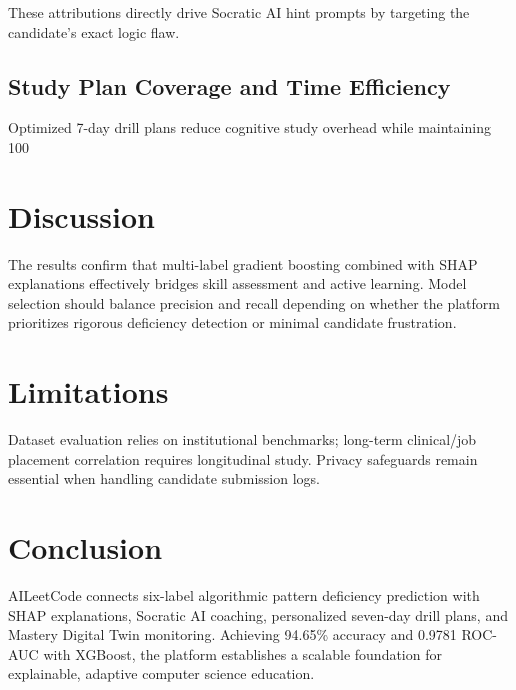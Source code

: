 \documentclass[conference]{IEEEtran}
\begin{document}
These attributions directly drive Socratic AI hint prompts by targeting the candidate's exact logic flaw.

\subsection{Study Plan Coverage and Time Efficiency}
Optimized 7-day drill plans reduce cognitive study overhead while maintaining 100%

\section{Discussion}
The results confirm that multi-label gradient boosting combined with SHAP explanations effectively bridges skill assessment and active learning. Model selection should balance precision and recall depending on whether the platform prioritizes rigorous deficiency detection or minimal candidate frustration.

\section{Limitations}
Dataset evaluation relies on institutional benchmarks; long-term clinical/job placement correlation requires longitudinal study. Privacy safeguards remain essential when handling candidate submission logs.

\section{Conclusion}
AILeetCode connects six-label algorithmic pattern deficiency prediction with SHAP explanations, Socratic AI coaching, personalized seven-day drill plans, and Mastery Digital Twin monitoring. Achieving 94.65\% accuracy and 0.9781 ROC-AUC with XGBoost, the platform establishes a scalable foundation for explainable, adaptive computer science education.
\end{document}
